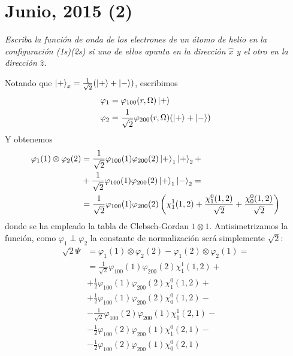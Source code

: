 \chapter{Junio, 2015 (2)}
\begin{tcolorbox}[halign=left]
  \emph{Escriba la función de onda de los electrones de un átomo de
    helio en la configuración (1s)(2s) si uno de ellos apunta en la
    dirección $\hat{x}$ y el otro en la dirección $\hat{z}$.}
\end{tcolorbox}
Notando que $\ket{+}_x = \frac{1}{\sqrt{2}}(\ket{+}+\ket{-})$,
escribimos
\begin{align}
  \varphi_1 &= \varphi_{100}(r,\Omega) \ket{+} \\
  \varphi_2 &= \frac{1}{\sqrt{2}} \varphi_{200}(r,\Omega) (\ket{+} + \ket{-})
\end{align}
Y obtenemos
\begin{equation}
  \begin{split}
    \varphi_1(1)\otimes\varphi_2(2) &= \frac{1}{\sqrt{2}}
    \varphi_{100}(1)\varphi_{200}(2)\ket{+}_1\ket{+}_2 + \\
    &+ \frac{1}{\sqrt{2}}\varphi_{100}(1)\varphi_{200}(2)\ket{+}_1\ket{-}_2 = \\
    &= \frac{1}{\sqrt{2}}\varphi_{100}(1)\varphi_{200}(2) \left(\chi_1^1(1,2) +
    \frac{\chi_1^0(1,2)}{\sqrt{2}} + \frac{\chi_0^0(1,2)}{\sqrt{2}}
       \right)
  \end{split}
\end{equation}
donde se ha empleado la tabla de Clebsch-Gordan $1\otimes 1$.
Antisimetrizamos la función, como $\varphi_1\perp\varphi_2$ la
constante de normalización será simplemente $\sqrt{2}$:
\begin{equation}
  \begin{split}
    \sqrt{2}\Psi &= \varphi_1(1)\otimes\varphi_2(2) -
    \varphi_1(2)\otimes\varphi_2(1) = \\
    &= \frac{1}{\sqrt{2}}\varphi_{100}(1)\varphi_{200}(2) \chi_1^1(1,2) + \\
    &+ \frac{1}{2}\varphi_{100}(1)\varphi_{200}(2) \chi_1^0(1,2) + \\
    &+ \frac{1}{2}\varphi_{100}(1)\varphi_{200}(2) \chi_0^0(1,2) - \\
    &- \frac{1}{\sqrt{2}}\varphi_{100}(2)\varphi_{200}(1) \chi_1^1(2,1) - \\
    &- \frac{1}{2}\varphi_{100}(2)\varphi_{200}(1) \chi_1^0(2,1) - \\
    &- \frac{1}{2}\varphi_{100}(2)\varphi_{200}(1) \chi_0^0(2,1) 
  \end{split}
\end{equation}




